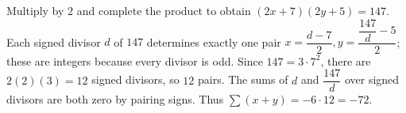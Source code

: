 Multiply by $2$ and complete the product to obtain $(2x+7)(2y+5)=147$. Each signed divisor $d$ of $147$ determines exactly one pair $x=\dfrac{d-7}{2},y=\dfrac{\dfrac{147}{d}-5}{2}$; these are integers because every divisor is odd. Since $147=3\cdot7^2$, there are $2(2)(3)=12$ signed divisors, so $\boxed{12}$ pairs. The sums of $d$ and $\dfrac{147}{d}$ over signed divisors are both zero by pairing signs. Thus $\sum(x+y)=-6\cdot12=\boxed{-72}$.
